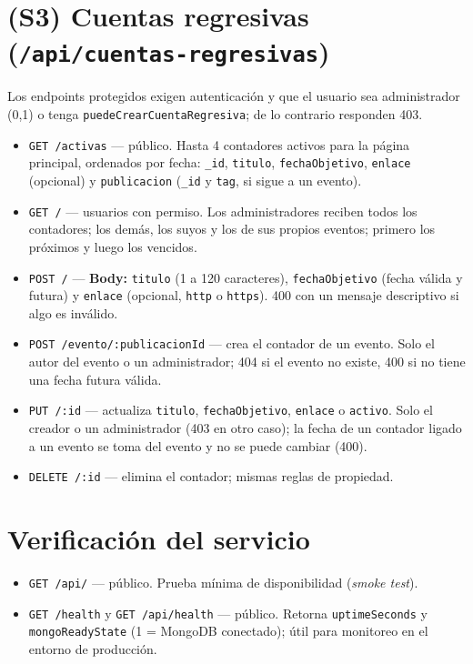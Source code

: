 \section{(S3) Cuentas regresivas (\texttt{/api/cuentas-regresivas})}
Los endpoints protegidos exigen autenticación y que el usuario sea administrador (0,1) o tenga \texttt{puedeCrearCuentaRegresiva}; de lo contrario responden 403.
\begin{itemize}
    \item \texttt{GET /activas} — público. Hasta 4 contadores activos para la página principal, ordenados por fecha: \texttt{\_id}, \texttt{titulo}, \texttt{fechaObjetivo}, \texttt{enlace} (opcional) y \texttt{publicacion} (\texttt{\_id} y \texttt{tag}, si sigue a un evento).
    \item \texttt{GET /} — usuarios con permiso. Los administradores reciben todos los contadores; los demás, los suyos y los de sus propios eventos; primero los próximos y luego los vencidos.
    \item \texttt{POST /} — \textbf{Body:} \texttt{titulo} (1 a 120 caracteres), \texttt{fechaObjetivo} (fecha válida y futura) y \texttt{enlace} (opcional, \texttt{http} o \texttt{https}). 400 con un mensaje descriptivo si algo es inválido.
    \item \texttt{POST /evento/:publicacionId} — crea el contador de un evento. Solo el autor del evento o un administrador; 404 si el evento no existe, 400 si no tiene una fecha futura válida.
    \item \texttt{PUT /:id} — actualiza \texttt{titulo}, \texttt{fechaObjetivo}, \texttt{enlace} o \texttt{activo}. Solo el creador o un administrador (403 en otro caso); la fecha de un contador ligado a un evento se toma del evento y no se puede cambiar (400).
    \item \texttt{DELETE /:id} — elimina el contador; mismas reglas de propiedad.
\end{itemize}

\section{Verificación del servicio}
\begin{itemize}
    \item \texttt{GET /api/} — público. Prueba mínima de disponibilidad (\textit{smoke test}).
    \item \texttt{GET /health} y \texttt{GET /api/health} — público. Retorna \texttt{uptimeSeconds} y \texttt{mongoReadyState} (1 = MongoDB conectado); útil para monitoreo en el entorno de producción.
\end{itemize}
